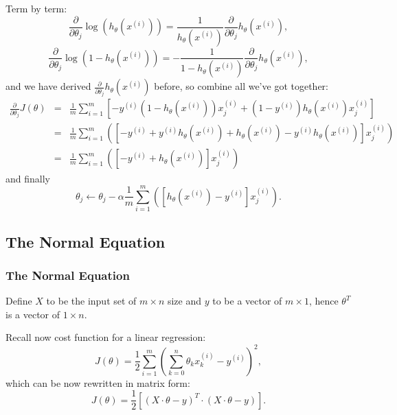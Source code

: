 \documentclass[a4paper,11pt]{article}
\begin{document}
Term by term:
\begin{equation}
\frac{\partial}{\partial \theta_j} \log \left(h_\theta \left(x^{(i)}\right) \right) = \frac{1}{h_\theta \left(x^{(i)}\right)} \frac{\partial}{\partial \theta_j} h_\theta \left(x^{(i)}\right),
\end{equation}
\begin{equation}
\frac{\partial}{\partial \theta_j} \log \left(1 - h_\theta \left(x^{(i)}\right) \right) = - \frac{1}{1 - h_\theta \left(x^{(i)}\right)} \frac{\partial}{\partial \theta_j} h_\theta \left(x^{(i)}\right) ,
\end{equation}
and we have derived \textcolor{OliveGreen}{$\frac{\partial}{\partial \theta_j} h_\theta \left(x^{(i)}\right)$} before, so combine all we've got together:
\begin{eqnarray}
\frac{\partial}{\partial \theta_j} J \left( \theta \right) &=& \frac{1}{m} \sum_{i=1} ^m \left[-y^{(i)}\left(1 - h_\theta \left(x^{(i)}\right) \right) x_j ^{(i)} + \left(1 - y^{(i)} \right) h_\theta \left(x^{(i)}\right) x_j ^{(i)} \right] \\
&=& \frac{1}{m} \sum_{i=1} ^m \left( \left[-y^{(i)} + y^{(i)}h_\theta \left(x^{(i)}\right) + h_\theta \left(x^{(i)}\right) - y^{(i)}h_\theta \left(x^{(i)}\right) \right] x_j ^{(i)} \right) \\
&=& \frac{1}{m} \sum_{i=1} ^m \left( \left[-y^{(i)} + h_\theta \left(x^{(i)}\right) \right] x_j ^{(i)} \right)
\end{eqnarray}
and finally
\begin{equation}
\theta_j \leftarrow \theta_j - \alpha \frac{1}{m} \sum_{i=1} ^m \left( \left[ h_\theta \left(x^{(i)}\right) - y^{(i)}\right] x_j ^{(i)} \right) .
\end{equation}
\subsection{The Normal Equation}
\subsubsection{The Normal Equation}
Define \textcolor{OliveGreen}{$X$} to be the input set of \textcolor{OliveGreen}{$m \times n$} size and \textcolor{OliveGreen}{$y$} to be a vector of \textcolor{OliveGreen}{$m \times 1$}, hence \textcolor{OliveGreen}{$\theta^T$} is a vector of \textcolor{OliveGreen}{$1 \times n$}.

Recall now cost function for a linear regression:
\begin{equation}
J \left( \theta \right) = \frac{1}{2} \sum_{i=1} ^m \left( \sum_{k = 0} ^n \theta_k x_k ^{(i)} - y^{(i)} \right)^2 ,
\end{equation}
which can be now rewritten in matrix form:
\begin{equation}
J \left(\theta \right) = \frac{1}{2} \left[ \left(X \cdot \theta - y \right)^T \cdot \left(X \cdot \theta - y \right) \right] .
\end{equation}
\end{document}
